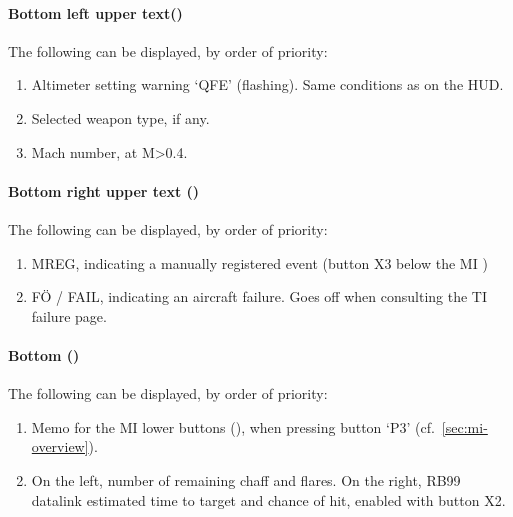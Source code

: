\paragraph{Bottom left upper text()}
The following can be displayed, by order of priority:
\begin{enumerate}[nosep]
  \item Altimeter setting warning `QFE' (flashing). Same conditions as on the HUD.
  \item Selected weapon type, if any.
  \item Mach number, at M>0.4.
\end{enumerate}

\paragraph{Bottom right upper text ()}
The following can be displayed, by order of priority:
\begin{enumerate}[nosep]
  \item MREG, indicating a manually registered event (button X3 below the MI )
  \item FÖ / FAIL, indicating an aircraft failure. Goes off when consulting the TI failure page.
\end{enumerate}

\paragraph{Bottom ()}
The following can be displayed, by order of priority:
\begin{enumerate}[nosep]
  \item Memo for the MI lower buttons (),
    when pressing button `P3' (cf.~\cref{sec:mi-overview}).
  \item On the left, number of remaining chaff and flares.
    On the right, RB99 datalink estimated time to target and chance of hit, enabled with button X2.
\end{enumerate}


